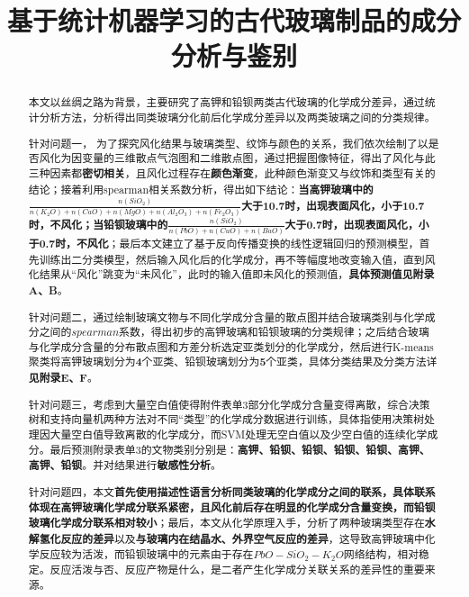 \documentclass[withoutpreface,bwprint]{cumcmthesis} %
\title{基于统计机器学习的古代玻璃制品的成分分析与鉴别}
\begin{document}
	\maketitle
	\begin{abstract}
		
本文以丝绸之路为背景，主要研究了高钾和铅钡两类古代玻璃的化学成分差异，通过统计分析方法，分析得出同类玻璃分化前后化学成分差异以及两类玻璃之间的分类规律。


针对问题一， 为了探究风化结果与玻璃类型、纹饰与颜色的关系，我们依次绘制了以是否风化为因变量的三维散点气泡图和二维散点图，通过把握图像特征，得出了风化与此三种因素都\textbf{密切相关}，且风化过程存在\textbf{颜色渐变}，此种颜色渐变又与纹饰和类型有关的结论；接着利用spearman相关系数分析，得出如下结论：\textbf{当高钾玻璃中的$\frac{n(SiO_{2})}{n(K_{2}O)+n(CaO)+n(MgO)+n(Al_{2}O_{3})+n(Fe_{2}O_{3})}$大于10.7时，出现表面风化，小于10.7时，不风化；当铅钡玻璃中的$\frac{n(SiO_{2})}{n(PbO)+n(CuO)+n(BaO)}$大于0.7时，出现表面风化，小于0.7时，不风化}；最后本文建立了基于反向传播变换的线性逻辑回归的预测模型，首先训练出二分类模型，然后输入风化后的化学成分，再不等幅度地改变输入值，直到风化结果从“风化”跳变为“未风化”，此时的输入值即未风化的预测值，\textbf{具体预测值见附录A、B}。


针对问题二，通过绘制玻璃文物与不同化学成分含量的散点图并结合玻璃类别与化学成分之间的$spearman$系数，得出初步的高钾玻璃和铅钡玻璃的分类规律；之后结合玻璃与化学成分含量的分布散点图和方差分析选定亚类划分的化学成分，然后进行K-means 聚类将高钾玻璃划分为\textbf{4}个亚类、铅钡玻璃划分为\textbf{5}个亚类，具体分类结果及分类方法详\textbf{见附录E、F}。


针对问题三，考虑到大量空白值使得附件表单3部分化学成分含量变得离散，综合决策树和支持向量机两种方法对不同“类型”的化学成分数据进行训练，具体指使用决策树处理因大量空白值导致离散的化学成分，而SVM处理无空白值以及少空白值的连续化学成分。最后预测附录表单3的文物类别分别是：\textbf{高钾、铅钡、铅钡、铅钡、铅钡、高钾、高钾、铅钡}。并对结果进行\textbf{敏感性分析}。


针对问题四，本文\textbf{首先使用描述性语言分析同类玻璃的化学成分之间的联系，具体联系体现在高钾玻璃化学成分联系紧密，且风化前后存在明显的化学成分含量变换，而铅钡玻璃化学成分联系相对较小}；最后，本文从化学原理入手，分析了两种玻璃类型存在\textbf{水解氢化反应的差异}以及\textbf{与玻璃内在结晶水、外界空气反应的差异}，这导致高钾玻璃中化学反应较为活泼，而铅钡玻璃中的元素由于存在$PbO-SiO_{2}-K_{2}O$网络结构，相对稳定。反应活泼与否、反应产物是什么，是二者产生化学成分关联关系的差异性的重要来源。

\end{abstract}
\end{document}
